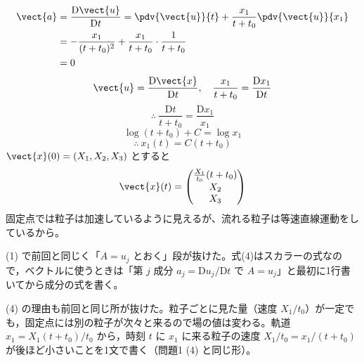 \begin{align*}
\vect{a}&=\frac{\mathrm{D}\vect{u}}{\mathrm{D}t}=\pdv{\vect{u}}{t}+\frac{x_{1}}{t+t_{0}}\pdv{\vect{u}}{x_{1}}\\
&=-\frac{x_{1}}{(t+t_{0})^{2}}+\frac{x_{1}}{t+t_{0}}\cdot\frac{1}{t+t_{0}}\\
&=0
\end{align*}
\[ \vect{u}=\frac{\mathrm{D}\vect{x}}{\mathrm{D}t},\quad \frac{x_{1}}{t+t_{0}}=\frac{\mathrm{D}x_{1}}{\mathrm{D}t} \]
\[ \therefore\ \frac{\mathrm{D}t}{t+t_{0}}=\frac{\mathrm{D}x_{1}}{x_{1}} \]
\[ \log(t+t_{0})+C=\log x_{1} \]
\[ \therefore\ x_{1}(t)=C(t+t_{0}) \]
$\vect{x}(0)=(X_{1},X_{2},X_{3})$ とすると
\[ \vect{x}(t)=\begin{pmatrix}\frac{X_{1}}{t_{0}}(t+t_{0})\\X_{2}\\X_{3}\end{pmatrix} \]
固定点では粒子は加速しているように見えるが、流れる粒子は等速直線運動をしているから。
\item {}(1) で前回と同じく「$A=u_{j}$ とおく」段が抜けた。式(4)はスカラーの式なので，ベクトルに使うときは「第 $j$ 成分 $a_{j}=\mathrm{D}u_{j}/\mathrm{D}t$ で $A=u_{j}$」と最初に1行書いてから成分の式を書く。
\item {}(4) の理由も前回と同じ所が抜けた。粒子ごとに見た量（速度 $X_{1}/t_{0}$）が一定でも，固定点には別の粒子が次々と来るので場の値は変わる。軌道 $x_{1}=X_{1}(t+t_{0})/t_{0}$ から，時刻 $t$ に $x_{1}$ に来る粒子の速度 $X_{1}/t_{0}=x_{1}/(t+t_{0})$ が後ほど小さいことを1文で書く（問題1 (4) と同じ形）。
